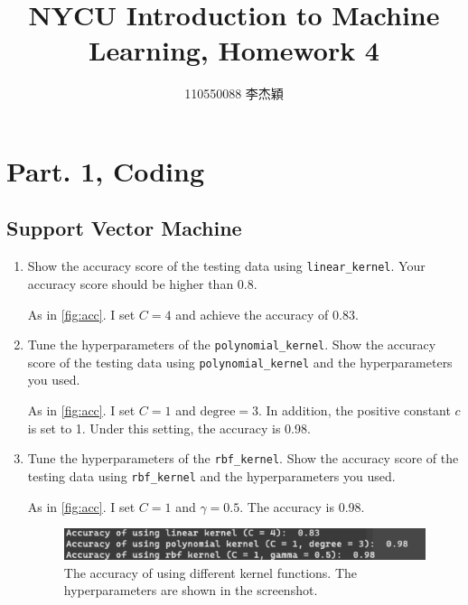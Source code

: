 \documentclass[twocolumn]{extarticle}
\title{NYCU Introduction to Machine Learning, Homework 4}
\author{110550088 李杰穎}
\date{}
\begin{document}
\maketitle

\section{Part. 1, Coding}
\subsection{Support Vector Machine}
\begin{enumerate}
\item Show the accuracy score of the testing data using \texttt{linear\_kernel}. Your accuracy score should be higher than 0.8.

As in \autoref{fig:acc}. I set $C=4$ and achieve the accuracy of 0.83.

\item Tune the hyperparameters of the \texttt{polynomial\_kernel}. Show the accuracy score of the testing data using \texttt{polynomial\_kernel} and the hyperparameters you used.

As in \autoref{fig:acc}. I set $C=1$ and $\text{degree}=3$. In addition, the positive constant $c$ is set to 1. Under this setting, the accuracy is 0.98.

\item Tune the hyperparameters of the \texttt{rbf\_kernel}. Show the accuracy score of the testing data using \texttt{rbf\_kernel} and the hyperparameters you used.

As in \autoref{fig:acc}. I set $C=1$ and $\gamma=0.5$. The accuracy is 0.98.

\begin{figure}[H]
\centering
\includegraphics[width=0.95\linewidth]{acc}
\caption{The accuracy of using different kernel functions. The hyperparameters are shown in the screenshot.}
\label{fig:acc}
\end{figure}



\end{enumerate}
\end{document}

